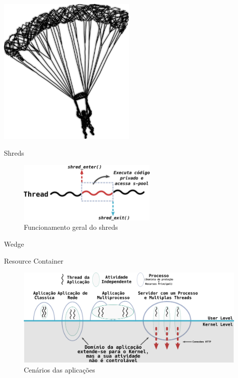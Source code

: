 \documentclass[xcolor={usenames,svgnames,dvipsnames},brazil,english,12pt,aspectratio=149]{beamer}
\begin{document}
\begin{frame}[plain]
  \includegraphics[width=0.5\textwidth]{presentation_cap2_one}
\end{frame}

\begin{frame}{Shreds}
	\begin{figure}[!h]
		\centering
		\includegraphics[width=0.6\textwidth]{shreds} 
		\caption{Funcionamento geral do shreds}
		\label{fig:shreds}
	\end{figure}
\end{frame}

\begin{frame}{Wedge}
\end{frame}

\begin{frame}{Resource Container}
	\begin{figure}[!h]
		\centering
		\includegraphics[width=\textwidth]{resource_constainer_scenarios} 
		\caption{Cenários das aplicações}
		\label{fig:resource_constainer_scenarios}
	\end{figure}
\end{frame}
\end{document}
